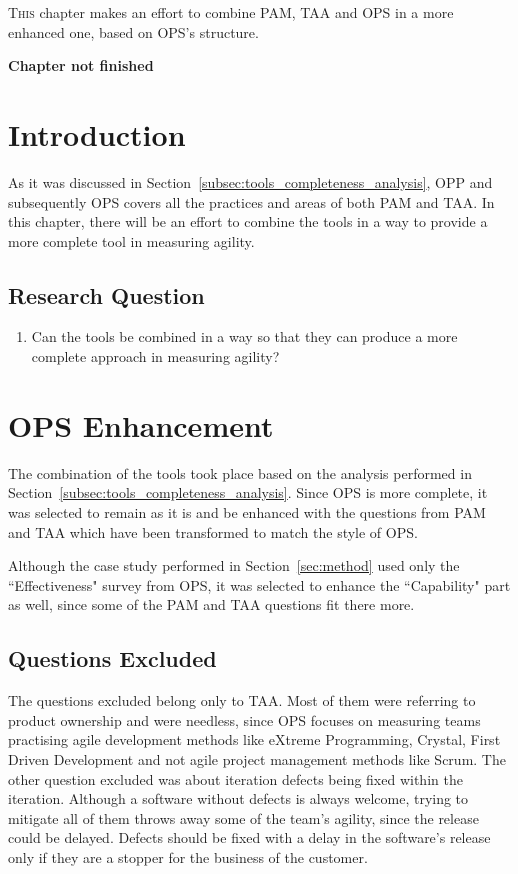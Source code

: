 \lettrine[lines=2, loversize=-0.1, lraise=0.1]{T}{his} chapter makes an effort to combine PAM, TAA and OPS in a more enhanced one, based on OPS's structure. 

\bigskip

\textbf{Chapter not finished}

\section{Introduction}
As it was discussed in Section~\ref{subsec:tools_completeness_analysis}, OPP and subsequently OPS covers all the practices and areas of both PAM and TAA. In this chapter, there will be an effort to combine the tools in a way to provide a more complete tool in measuring agility.

\subsection{Research Question}
\begin{enumerate}
	\setcounter{enumi}{\thetmpc} %
	\item Can the tools be combined in a way so that they can produce a more complete approach in measuring agility?
\end{enumerate}

\section{OPS Enhancement}
The combination of the tools took place based on the analysis performed in Section~\ref{subsec:tools_completeness_analysis}. Since OPS is more complete, it was selected to remain as it is and be enhanced with the questions from PAM and TAA which have been transformed to match the style of OPS.

Although the case study performed in Section~\ref{sec:method} used only the ``Effectiveness" survey from OPS, it was selected to enhance the ``Capability" part as well, since some of the PAM and TAA questions fit there more.

\subsection{Questions Excluded}
The questions excluded belong only to TAA. Most of them were referring to product ownership and were needless, since OPS focuses on measuring teams practising agile development methods like eXtreme Programming, Crystal, First Driven Development and not agile project management methods like Scrum. The other question excluded was about iteration defects being fixed within the iteration. Although a software without defects is always welcome, trying to mitigate all of them throws away some of the team's agility, since the release could be delayed. Defects should be fixed with a delay in the software's release only if they are a stopper for the business of the customer.

